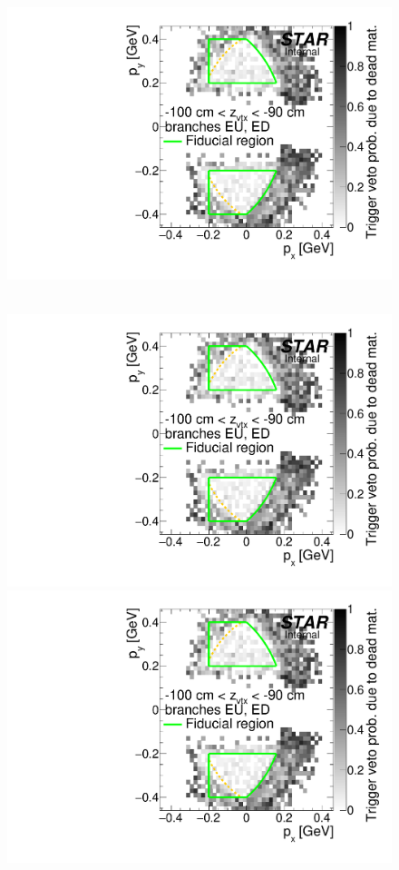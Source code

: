 \begin{figure}[hb]
{  \includegraphics[width=\linewidth,page=7]{graphics/corrections/mcDeadMatProbPxPy.pdf}
}~
\parbox{0.495\textwidth}{
  \centering
  \includegraphics[width=\linewidth,page=4]{graphics/corrections/mcDeadMatProbPxPy.pdf}\\
  \includegraphics[width=\linewidth,page=6]{graphics/corrections/mcDeadMatProbPxPy.pdf}\\
}
\end{figure}
